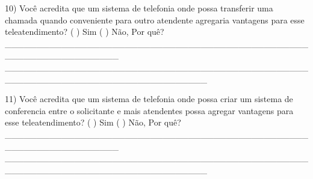 10) Você acredita que um sistema de telefonia onde possa transferir uma chamada quando conveniente para outro atendente agregaria vantagens para esse teleatendimento?
( ) Sim
( ) Não, Por quê? __________________________________________________________________
________________________________________________________________________________

11) Você acredita que um sistema de telefonia onde possa criar um sistema de conferencia entre
o solicitante e mais atendentes possa agregar vantagens para esse teleatendimento?
( ) Sim
( ) Não, Por quê? __________________________________________________________________
________________________________________________________________________________
